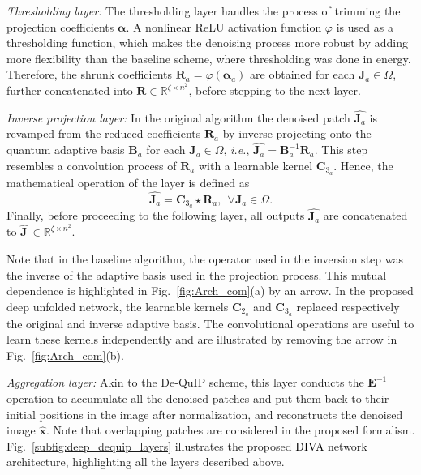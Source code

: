 \documentclass[10pt,journal,compsoc]{IEEEtran}
\newcommand{\dk}{\textcolor{black}}
\def\bsx{{\boldsymbol{x}}}
\def\bsJ{{\boldsymbol{J}}}
\def\bsB{{\boldsymbol{B}}}
\def\bsC{{\boldsymbol{C}}}
\def\bsE{{\boldsymbol{E}}}
\def\bsR{{\boldsymbol{R}}}
\def\balpha{{\boldsymbol{\alpha}}}
\begin{document}
\textit{Thresholding layer:}
The thresholding layer handles the process of trimming the projection coefficients $\balpha$. A nonlinear ReLU activation function $\varphi$ is used as a thresholding function, which makes the denoising process more robust by adding more flexibility than the baseline scheme, where thresholding was done in energy. Therefore, the shrunk coefficients $\bsR_a = \varphi(\balpha_a)$ are obtained for each $\bsJ_a \in \Omega$, further concatenated into $\bsR \in \mathbb{R}^{\zeta \times n^2}$, before stepping to the next layer.




\textit{Inverse projection layer:}
In the original algorithm the denoised patch $\hat{\bsJ_a}$ is revamped from the reduced coefficients $\bsR_a$ by inverse projecting onto the quantum adaptive basis $\bsB_a$ for each $\bsJ_a \in \Omega$, \textit{i.e.}, $\hat{\bsJ_a} = \bsB_a^{-1} \bsR_a$. This step resembles a convolution process of $\bsR_a$ with a learnable kernel $\bsC_{3_a}$. Hence, the mathematical operation of the layer is defined as
\begin{equation}
\hat{\bsJ_a} = \bsC_{3_a} \star \bsR_a, ~~\forall \bsJ_a \in \Omega.
\label{eq:inve_proj}
\end{equation}
Finally, before proceeding to the following layer, all outputs $\hat{\bsJ_a}$ are concatenated to $\hat{\bsJ~} \in \mathbb{R}^{\zeta \times n^2}$.

Note that in the baseline algorithm, the operator used in the inversion step was the inverse of the adaptive basis used in the projection process. This mutual dependence is highlighted in Fig.~\ref{fig:Arch_com}(a) by an arrow. In the proposed deep unfolded network, the learnable kernels $\bsC_{2_a}$ and $\bsC_{3_a}$ replaced respectively the original and inverse adaptive basis. The convolutional operations are useful to learn these kernels independently and are illustrated by removing the arrow in Fig.~\ref{fig:Arch_com}(b).





\textit{Aggregation layer:}
Akin to the De-QuIP scheme, this layer conducts the $\bsE^{-1}$ operation to accumulate all the denoised patches and put them back to their initial positions in the image after normalization, and reconstructs the denoised image $\hat{\bsx}$. Note that overlapping patches are considered in the proposed formalism. Fig.~\ref{subfig:deep_dequip_layers} illustrates the proposed \dk{DIVA} network architecture, highlighting all the layers described above.
\end{document}
